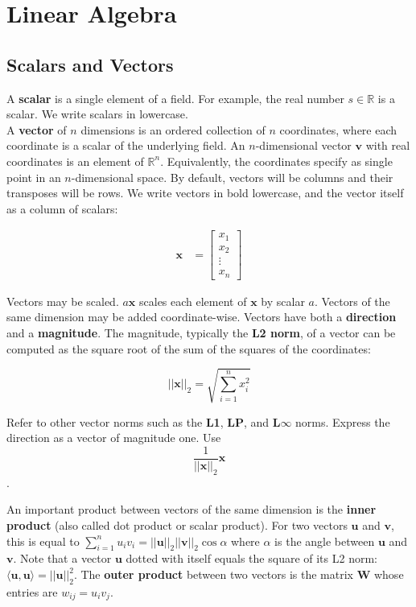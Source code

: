 \documentclass{harvardml}
\theoremstyle{definition}
\theoremstyle{plain}
\newcommand{\R}{\mathbb{R}}
\renewcommand{\v}[1]{\mathbf{#1}}
\begin{document}
\section{Linear Algebra}
    \subsection{Scalars and Vectors}
		A \textbf{scalar} is a single element
		of a field. For example, the real number $s \in \R$
		is a scalar. We write scalars in lowercase.\\

		\noindent A \textbf{vector} of $n$ dimensions is an ordered
		collection of $n$ coordinates, where each coordinate is a scalar
		of the underlying field. An $n$-dimensional vector $\v v$ with
		real coordinates is an element of $\R^n$. Equivalently, the 
		coordinates specify as single point in an $n$-dimensional space. 
		By default, vectors will be columns and their transposes will be 
		rows. We write vectors in bold lowercase, and the vector itself 
		as a column of scalars:

		\begin{align*}
    		\mathbf{x} &= \begin{bmatrix}
           					x_{1} \\
           					x_{2} \\
           					\vdots \\
           					x_{n}
         				  \end{bmatrix}
  		\end{align*}


		\noindent Vectors may be scaled. $a\v x$ scales 
		each element of $\v x$ by scalar $a$. Vectors
		of the same dimension may be added coordinate-wise. 
		Vectors have both a \textbf{direction} and a
		\textbf{magnitude}. The magnitude, typically the
		\textbf{L2 norm}, of a vector can be computed as the
		square root of the sum of the squares of the coordinates:
		
		$$ ||\v x||_2 = \sqrt{\sum_{i=1}^{n} x_i^2} $$

		\noindent Refer to other vector norms
        such as the \textbf{L1}, \textbf{LP}, and
        \textbf{L}$\boldsymbol{\infty}$ norms. 
        Express the direction  as a vector of magnitude one. 
        Use $$ \frac{1}{||\mathbf{x}||_2}\mathbf{x} $$.
        
        \noindent An important product between vectors of the
                  same dimension is the \textbf{inner product} 
                  (also called dot product or scalar product).
                  For two vectors $\mathbf{u}$ and $\mathbf{v}$,
                  this is equal to $\sum_{i=1}^nu_iv_i = ||\mathbf{u}||_2 ||\mathbf{v}||_2 \cos \alpha$ where
		  $\alpha$ is the angle between $\v u$ and $\v v$. Note that
                  a vector $\mathbf{u}$ dotted with itself equals
                  the square of its L2 norm: $\langle \mathbf{u},
                  \mathbf{u} \rangle = ||\mathbf{u}||_2^2$. The 
                  \textbf{outer product} between two vectors is
                  the matrix $\mathbf{W}$ whose entries are
                  $w_{ij} = u_iv_j$.
   
\end{document}
